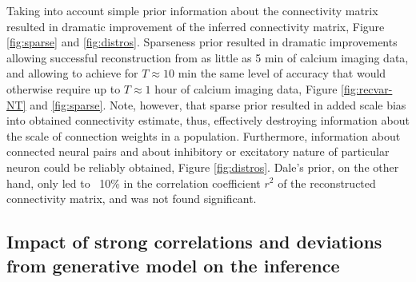 Taking into account simple prior information about the connectivity matrix resulted in dramatic improvement of the inferred connectivity matrix, Figure \ref{fig:sparse} and \ref{fig:distros}. Sparseness prior resulted in dramatic improvements allowing successful reconstruction from as little as 5 min of calcium imaging data, and allowing to achieve for $T\approx 10$ min the same level of accuracy that would otherwise require up to $T\approx 1$ hour of calcium imaging data, Figure \ref{fig:recvar-NT} and \ref{fig:sparse}. 
Note, however, that sparse prior resulted in added scale bias into obtained connectivity estimate, thus, effectively destroying information about the scale of connection weights in a population.
Furthermore, information about connected neural pairs and about inhibitory or excitatory nature of particular neuron could be reliably obtained, Figure \ref{fig:distros}.
Dale's prior, on the other hand, only led to ~10\% in the correlation coefficient $r^2$ of the reconstructed connectivity matrix, and was not found significant.

\subsection{Impact of strong correlations and deviations from generative model on the inference}

